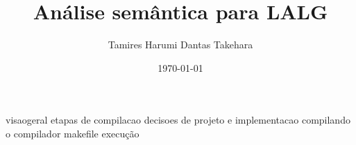 \documentclass[a4paper]{article}
\title{Análise semântica para LALG}
\author{Tamires Harumi Dantas Takehara}
\date{\today}
\begin{document}
	\maketitle
	
	visaogeral
		etapas de compilacao
	decisoes de projeto e implementacao
	compilando o compilador
		makefile
		execução
\end{document}
